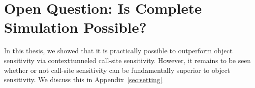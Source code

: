 \section{Open Question: Is Complete Simulation Possible?}
In this thesis, we showed that it is practically possible to outperform object sensitivity via contexttunneled call-site sensitivity. However, it remains to be seen whether or not call-site sensitivity can
be fundamentally superior to object sensitivity. 
We discuss this in Appendix~\ref{sec:setting}

